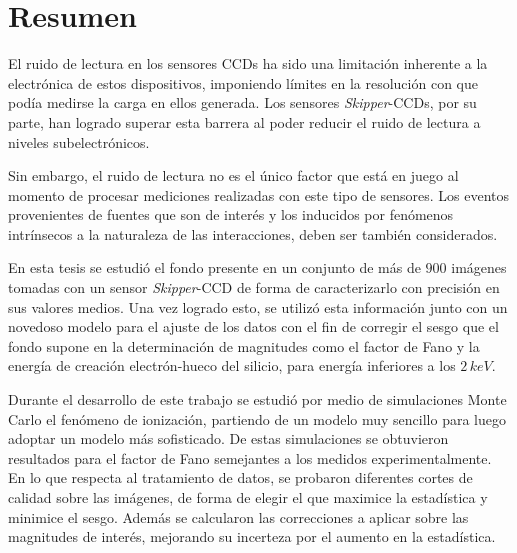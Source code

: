 \newpage
\chapter*{Resumen}
\thispagestyle{empty}
\noindent El ruido de lectura en los sensores CCDs ha sido una limitación inherente a la electrónica de estos dispositivos, imponiendo límites en la resolución con que podía medirse la carga en ellos generada. Los sensores \textit{Skipper}-CCDs, por su parte, han logrado superar esta barrera al poder reducir el ruido de lectura a niveles subelectrónicos.

Sin embargo, el ruido de lectura no es el único factor que está en juego al momento de procesar mediciones realizadas con este tipo de sensores. Los eventos provenientes de fuentes que son de interés y los inducidos por fenómenos intrínsecos a la naturaleza de las interacciones, deben ser también considerados.

En esta tesis se estudió el fondo presente en un conjunto de más de $900$ imágenes tomadas con un sensor \textit{Skipper}-CCD de forma de caracterizarlo con precisión en sus valores medios. Una vez logrado esto, se utilizó esta información junto con un novedoso modelo para el ajuste de los datos con el fin de corregir el sesgo que el fondo supone en la determinación de magnitudes como el factor de Fano y la energía de creación electrón-hueco del silicio, para energía inferiores a los $2\,\si{keV}$.

Durante el desarrollo de este trabajo se estudió por medio de simulaciones Monte Carlo el fenómeno de ionización, partiendo de un modelo muy sencillo para luego adoptar un modelo más sofisticado. De estas simulaciones se obtuvieron resultados para el factor de Fano semejantes a los medidos experimentalmente. En lo que respecta al tratamiento de datos, se probaron diferentes cortes de calidad sobre las imágenes, de forma de elegir el que maximice la estadística y minimice el sesgo. Además se calcularon las correcciones a aplicar sobre las magnitudes de interés, mejorando su incerteza por el aumento en la estadística.

